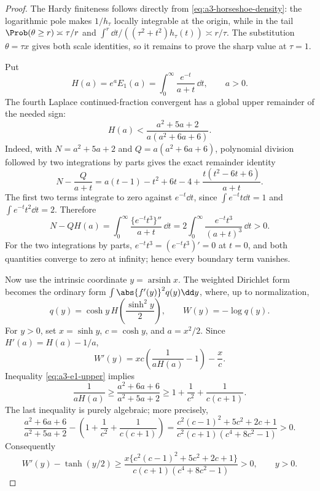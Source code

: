 \documentclass[../../main.tex]{subfiles}
\begin{document}
\begin{proof}
The Hardy finiteness follows directly from \eqref{eq:a3-horseshoe-density}: the logarithmic pole
makes $1/h_\tau$ locally integrable at the origin, while in the tail
$\Prob(\theta\ge r)\asymp\tau/r$ and
$\int^r\dd t/((\tau^2+t^2)h_\tau(t))\asymp r/\tau$.  The substitution
$\theta=\tau x$ gives both scale identities, so it remains to prove the sharp value at $\tau=1$.

Put
\[
  H(a)=e^aE_1(a)=\int_0^\infty\frac{e^{-t}}{a+t}\,\dd t,
  \qquad a>0.
\]
The fourth Laplace continued-fraction convergent has a global upper remainder of the needed sign:
\begin{equation}\label{eq:a3-e1-upper}
 H(a)<\frac{a^2+5a+2}{a(a^2+6a+6)}.
\end{equation}
Indeed, with $N=a^2+5a+2$ and $Q=a(a^2+6a+6)$, polynomial division followed by two integrations
by parts gives the exact remainder identity
\[
 N-\frac{Q}{a+t}
 =a(t-1)-t^2+6t-4+\frac{t(t^2-6t+6)}{a+t}.
\]
The first two terms integrate to zero against $e^{-t}\dd t$, since
$\int e^{-t}t\dd t=1$ and $\int e^{-t}t^2\dd t=2$.  Therefore
\[
 N-QH(a)
 =\int_0^\infty\frac{\{e^{-t}t^3\}''}{a+t}\,\dd t
 =2\int_0^\infty\frac{e^{-t}t^3}{(a+t)^3}\,\dd t>0.
\]
For the two integrations by parts, $e^{-t}t^3=(e^{-t}t^3)'=0$ at $t=0$, and both quantities
converge to zero at infinity; hence every boundary term vanishes.

Now use the intrinsic coordinate $y=\operatorname{arsinh}x$.  The weighted Dirichlet form becomes
the ordinary form $\int\abs{f'(y)}^2q(y)\dd y$, where, up to normalization,
\[
 q(y)=\cosh y\,H\!\left(\frac{\sinh^2y}{2}\right),
 \qquad W(y)=-\log q(y).
\]
For $y>0$, set $x=\sinh y$, $c=\cosh y$, and $a=x^2/2$.  Since
$H'(a)=H(a)-1/a$,
\[
 W'(y)=xc\left(\frac1{aH(a)}-1\right)-\frac{x}{c}.
\]
Inequality \eqref{eq:a3-e1-upper} implies
\[
 \frac1{aH(a)}\ge\frac{a^2+6a+6}{a^2+5a+2}
 \ge 1+\frac1{c^2}+\frac1{c(c+1)}.
\]
The last inequality is purely algebraic; more precisely,
\[
 \frac{a^2+6a+6}{a^2+5a+2}
 -\left(1+\frac1{c^2}+\frac1{c(c+1)}\right)
 =\frac{c^2(c-1)^2+5c^2+2c+1}
 {c^2(c+1)(c^4+8c^2-1)}>0.
\]
Consequently
\begin{equation}\label{eq:a3-horseshoe-drift}
 W'(y)-\tanh(y/2)
 \ge\frac{x\{c^2(c-1)^2+5c^2+2c+1\}}
 {c(c+1)(c^4+8c^2-1)}>0,
 \qquad y>0.
\end{equation}


\end{proof}
\end{document}
